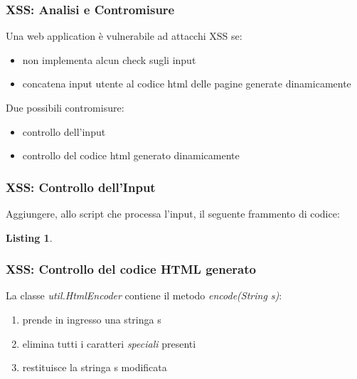 \documentclass{beamer}
\newtheorem{codice}{Listing}
\begin{document}
\begin{frame}
  \frametitle{XSS: Analisi e Contromisure}
  Una web application \`e vulnerabile ad attacchi XSS se:
  \begin{itemize}
  \item non implementa alcun check sugli input
  \item concatena input utente al codice html delle pagine generate dinamicamente
  \end{itemize}
  \pause
  \medskip
  Due possibili contromisure:
  \begin{itemize}
  \item controllo dell'input
  \item controllo del codice html generato dinamicamente
  \end{itemize}
\end{frame}


\begin{frame}[fragile]
  \frametitle{XSS: Controllo dell'Input}
  Aggiungere, allo script che processa l'input, il seguente frammento di codice:
  \begin{codice}
    \begin{semiverbatim}
    \end{semiverbatim}
  \end{codice}
\end{frame}

\begin{frame}
  \frametitle{XSS: Controllo del codice HTML generato}
  La classe \emph{util.HtmlEncoder} contiene il metodo \emph{encode(String s)}:
  \pause
  \begin{enumerate}
  \item prende in ingresso una stringa s
    \pause
  \item elimina tutti i caratteri \emph{speciali} presenti
    \pause
  \item restituisce la stringa s modificata
  \end{enumerate}
\end{frame}
\end{document}
